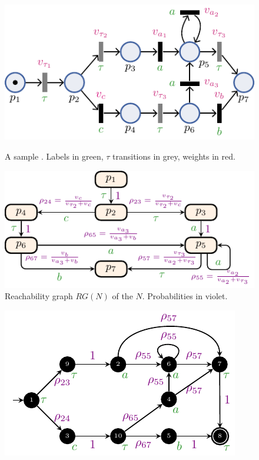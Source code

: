 \begin{figure}[!t]
	\begin{minipage}{.49\textwidth}
		\includegraphics[width=.9\textwidth]{images/petri.pdf}
		\caption{A sample \uswn. Labels in green, $\tau$ transitions in grey, weights in red.}\label{fig:spn}
	\end{minipage}\hfill \begin{minipage}{.49\textwidth}
		\includegraphics[width=.9\textwidth]{images/rg.pdf}
		\caption{Reachability graph $RG(N)$ of the \uswn $N$. Probabilities in violet.}\label{fig:rg}
	\end{minipage}
\end{figure} \begin{figure}[!t]
	\begin{minipage}{.49\textwidth} \includegraphics[width=.9\textwidth]{images/running_example.pdf}

\end{minipage}
\end{figure}
